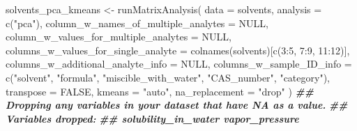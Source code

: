 \documentclass[
]{krantz}
\newenvironment{Shaded}{\begin{snugshade}}{\end{snugshade}}
\newcommand{\AttributeTok}[1]{\textcolor[rgb]{0.77,0.63,0.00}{#1}}
\newcommand{\ConstantTok}[1]{\textcolor[rgb]{0.00,0.00,0.00}{#1}}
\newcommand{\DecValTok}[1]{\textcolor[rgb]{0.00,0.00,0.81}{#1}}
\newcommand{\DocumentationTok}[1]{\textcolor[rgb]{0.56,0.35,0.01}{\textbf{\textit{#1}}}}
\newcommand{\FunctionTok}[1]{\textcolor[rgb]{0.00,0.00,0.00}{#1}}
\newcommand{\NormalTok}[1]{#1}
\newcommand{\OtherTok}[1]{\textcolor[rgb]{0.56,0.35,0.01}{#1}}
\newcommand{\SpecialCharTok}[1]{\textcolor[rgb]{0.00,0.00,0.00}{#1}}
\newcommand{\StringTok}[1]{\textcolor[rgb]{0.31,0.60,0.02}{#1}}
\begin{document}
\begin{Shaded}
\begin{Highlighting}[]
\NormalTok{solvents\_pca\_kmeans }\OtherTok{\textless{}{-}} \FunctionTok{runMatrixAnalysis}\NormalTok{(}
  \AttributeTok{data =}\NormalTok{ solvents,}
  \AttributeTok{analysis =} \FunctionTok{c}\NormalTok{(}\StringTok{"pca"}\NormalTok{),}
  \AttributeTok{column\_w\_names\_of\_multiple\_analytes =} \ConstantTok{NULL}\NormalTok{,}
  \AttributeTok{column\_w\_values\_for\_multiple\_analytes =} \ConstantTok{NULL}\NormalTok{,}
  \AttributeTok{columns\_w\_values\_for\_single\_analyte =} \FunctionTok{colnames}\NormalTok{(solvents)[}\FunctionTok{c}\NormalTok{(}\DecValTok{3}\SpecialCharTok{:}\DecValTok{5}\NormalTok{, }\DecValTok{7}\SpecialCharTok{:}\DecValTok{9}\NormalTok{, }\DecValTok{11}\SpecialCharTok{:}\DecValTok{12}\NormalTok{)],}
  \AttributeTok{columns\_w\_additional\_analyte\_info =} \ConstantTok{NULL}\NormalTok{,}
  \AttributeTok{columns\_w\_sample\_ID\_info =} \FunctionTok{c}\NormalTok{(}\StringTok{"solvent"}\NormalTok{, }\StringTok{"formula"}\NormalTok{, }\StringTok{"miscible\_with\_water"}\NormalTok{, }\StringTok{"CAS\_number"}\NormalTok{, }\StringTok{"category"}\NormalTok{),}
  \AttributeTok{transpose =} \ConstantTok{FALSE}\NormalTok{,}
  \AttributeTok{kmeans =} \StringTok{"auto"}\NormalTok{,}
  \AttributeTok{na\_replacement =} \StringTok{"drop"}
\NormalTok{)}
\DocumentationTok{\#\# Dropping any variables in your dataset that have NA as a value.}
\DocumentationTok{\#\# Variables dropped:}
\DocumentationTok{\#\# solubility\_in\_water vapor\_pressure}


\end{Highlighting}
\end{Shaded}
\end{document}
